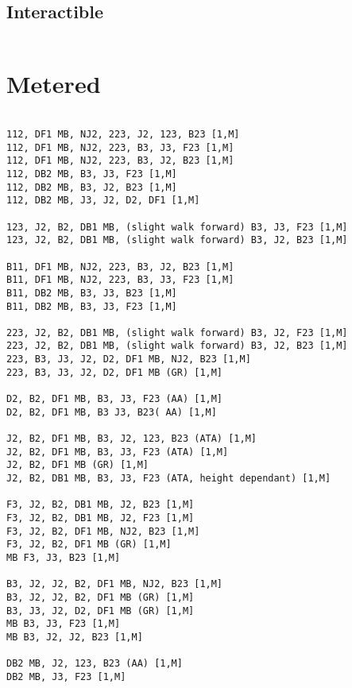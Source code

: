 \documentclass[main.tex]{subfiles}
\begin{document}
\begin{lstlisting}[language=FG]

\end{lstlisting}


\subsection{Interactible}
\begin{lstlisting}[language=FG]

\end{lstlisting}

\section{Metered}


\begin{lstlisting}[language=FG]

112, DF1 MB, NJ2, 223, J2, 123, B23 [1,M]
112, DF1 MB, NJ2, 223, B3, J3, F23 [1,M]
112, DF1 MB, NJ2, 223, B3, J2, B23 [1,M]
112, DB2 MB, B3, J3, F23 [1,M]
112, DB2 MB, B3, J2, B23 [1,M]
112, DB2 MB, J3, J2, D2, DF1 [1,M]

123, J2, B2, DB1 MB, (slight walk forward) B3, J3, F23 [1,M]
123, J2, B2, DB1 MB, (slight walk forward) B3, J2, B23 [1,M]

B11, DF1 MB, NJ2, 223, B3, J2, B23 [1,M]
B11, DF1 MB, NJ2, 223, B3, J3, F23 [1,M]
B11, DB2 MB, B3, J3, B23 [1,M]
B11, DB2 MB, B3, J3, F23 [1,M]

223, J2, B2, DB1 MB, (slight walk forward) B3, J2, F23 [1,M]
223, J2, B2, DB1 MB, (slight walk forward) B3, J2, B23 [1,M]
223, B3, J3, J2, D2, DF1 MB, NJ2, B23 [1,M]
223, B3, J3, J2, D2, DF1 MB (GR) [1,M]

D2, B2, DF1 MB, B3, J3, F23 (AA) [1,M]
D2, B2, DF1 MB, B3 J3, B23( AA) [1,M]

J2, B2, DF1 MB, B3, J2, 123, B23 (ATA) [1,M]
J2, B2, DF1 MB, B3, J3, F23 (ATA) [1,M]
J2, B2, DF1 MB (GR) [1,M]
J2, B2, DB1 MB, B3, J3, F23 (ATA, height dependant) [1,M]

F3, J2, B2, DB1 MB, J2, B23 [1,M]
F3, J2, B2, DB1 MB, J2, F23 [1,M]
F3, J2, B2, DF1 MB, NJ2, B23 [1,M]
F3, J2, B2, DF1 MB (GR) [1,M]
MB F3, J3, B23 [1,M]

B3, J2, J2, B2, DF1 MB, NJ2, B23 [1,M]
B3, J2, J2, B2, DF1 MB (GR) [1,M]
B3, J3, J2, D2, DF1 MB (GR) [1,M]
MB B3, J3, F23 [1,M]
MB B3, J2, J2, B23 [1,M]

DB2 MB, J2, 123, B23 (AA) [1,M]
DB2 MB, J3, F23 [1,M]



\end{lstlisting}
\end{document}
